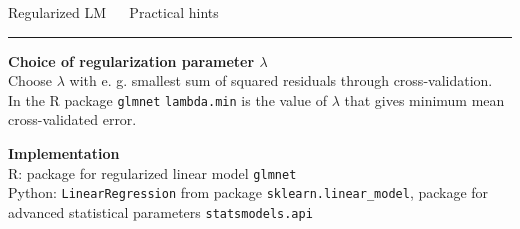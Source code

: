 \documentclass[11pt,compress,t,notes=noshow, xcolor=table]{beamer}
\begin{document}

\LARGE
\begin{frame}{\textcolor{gray!80}{Regularized LM} ~~ Practical hints}
\normalsize
\vspace{-0.5cm}
\noindent \textcolor{gray!80}{\rule{\textwidth}{1pt}}

\vspace{0.3cm}

\footnotesize

  \textbf{\textcolor{gray!80}{Choice of regularization parameter  $\lambda$}} \\
  \smallskip
 Choose $\lambda$ with e. g. smallest sum of squared residuals through cross-validation. \\
 In the R package \texttt{glmnet} \texttt{lambda.min} is the value of $\lambda$ that gives minimum mean cross-validated error.
 
 

\lz

  \textbf{\textcolor{gray!80}{Implementation}} \\
  \smallskip
  R: package for regularized linear model \texttt{glmnet}\\
  Python: \texttt{LinearRegression} from package \texttt{sklearn.linear\_model}, package for advanced statistical parameters \texttt{statsmodels.api}

\end{frame}





% 
\end{document}
